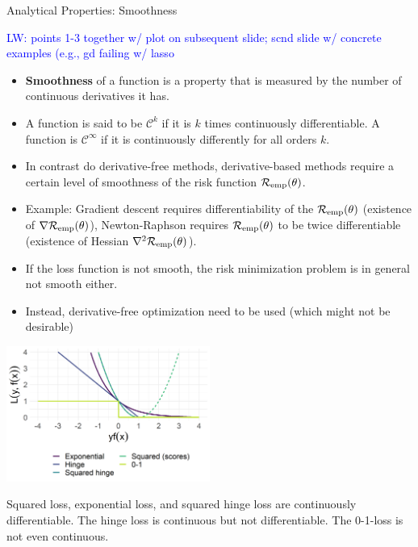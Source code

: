 
\begin{vbframe}{Analytical Properties: Smoothness}

\textcolor{blue}{LW: points 1-3 together w/ plot on subsequent slide; scnd slide w/ concrete examples (e.g., gd failing w/ lasso}

\begin{itemize}
    \item \textbf{Smoothness} of a function is a property that is measured by the number of continuous derivatives it has. 
    \item A function is said to be $\mathcal{C}^k$ if it is $k$ times continuously differentiable. A function is $\mathcal{C}^\infty$ if it is continuously differently for all orders $k$. 
    \item In contrast do derivative-free methods, derivative-based methods require a certain level of smoothness of the risk function $\mathcal{R}_{\text{emp}}(\theta)$. 
    \item Example: Gradient descent requires differentiability of the $\mathcal{R}_{\text{emp}}(\theta)$ (existence of $\nabla \mathcal{R}_{\text{emp}}(\theta)$), Newton-Raphson requires $\mathcal{R}_{\text{emp}}(\theta)$ to be twice differentiable (existence of Hessian $\nabla^2 \mathcal{R}_{\text{emp}}(\theta)$). 

    \framebreak 

    \item If the loss function is not smooth, the risk minimization problem is in general not smooth either. 
    \item  Instead, derivative-free optimization need to be used (which might not be desirable)
\end{itemize}

\begin{center}
  \includegraphics[width = 0.5\textwidth]{figure/plot_loss_overview_classif.png} \\
  \begin{footnotesize}
    Squared loss, exponential loss, and squared hinge loss are continuously differentiable. The hinge loss is continuous but not differentiable. The 0-1-loss is not even continuous.   
  \end{footnotesize}
\end{center}



\end{vbframe}

